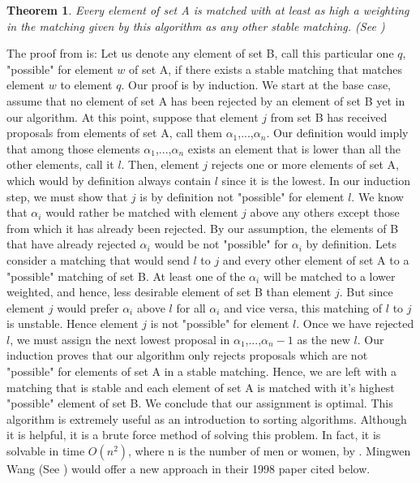\documentclass[letterpaper,11pt,twocolumn]{article}
\newtheorem{theorem}{Theorem}
\begin{document}
\begin{theorem}\label{thm2}
	Every element of set A is matched with at least as high a weighting in the matching given by this algorithm as any other stable matching. (See \cite{latexcompanion})
	\end{theorem}
The proof from \cite{latexcompanion} is: Let us denote any element of set B, call this particular one $q$, "possible" for element $w$ of set A, if there exists a stable matching that matches element $w$ to element $q$. Our proof is by induction. We start at the base case, assume that no element of set A has been rejected by an element of set B yet in our algorithm. At this point, suppose that element $j$ from set B has received proposals from elements of set A, call them $\alpha_1$,...,$\alpha_n$. Our definition would imply that among those elements $\alpha_1$,...,$\alpha_n$ exists an element that is lower than all the other elements, call it $l$. Then, element $j$ rejects one or more elements of set A, which would by definition always contain $l$ since it is the lowest. In our induction step, we must show that $j$ is by definition not "possible" for element $l$. We know that $\alpha_i$ would rather be matched with element $j$ above any others except those from which it has already been rejected. By our assumption, the elements of B that have already rejected $\alpha_i$ would be not "possible" for $\alpha_i$ by definition. Lets consider a matching that would send $l$ to $j$ and every other element of set A to a "possible" matching of set B. At least one of the $\alpha_i$ will be matched to a lower weighted, and hence, less desirable element of set B than element $j$. But since element $j$ would prefer $\alpha_i$ above $l$ for all $\alpha_i$ and vice versa, this matching of $l$ to $j$ is unstable. Hence element $j$ is not "possible" for element $l$. Once we have rejected $l$, we must assign the next lowest proposal in $\alpha_1$,...,$\alpha_n-1$ as the new $l$. Our induction proves that our algorithm only rejects proposals which are not "possible" for elements of set A in a stable matching. Hence, we are left with a matching that is stable and each element of set A is matched with it's highest "possible" element of set B. We conclude that our assignment is optimal. This algorithm is extremely useful as an introduction to sorting algorithms. Although it is helpful, it is a brute force method of solving this problem. In fact, it is solvable in time $O(n^2)$, where n is the number of men or women, by \cite{latexcompanion}. Mingwen Wang (See \cite{3}) would offer a new approach in their 1998 paper cited below.
\end{document}
